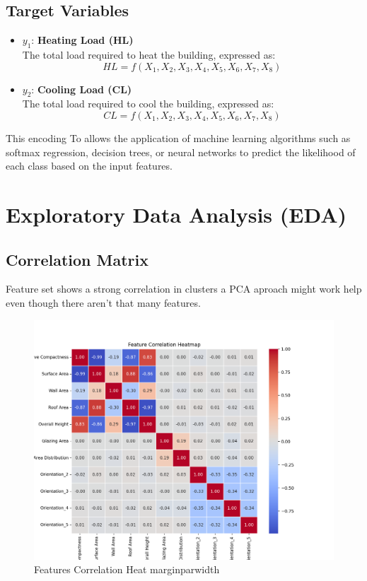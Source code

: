 \documentclass{article}
\begin{document}
\subsection{Target Variables}
\begin{itemize}
    \item \( y_1 \): \textbf{Heating Load (HL)}\\
    The total load required to heat the building, expressed as:
    \[
    HL = f(X_1, X_2, X_3, X_4, X_5, X_6, X_7, X_8)
    \]
    
    \item \( y_2 \): \textbf{Cooling Load (CL)}\\
    The total load required to cool the building, expressed as:
    \[
    CL = f(X_1, X_2, X_3, X_4, X_5, X_6, X_7, X_8)
    \]
\end{itemize}
This encoding To allows the application of machine learning algorithms such as softmax regression, decision trees, or neural networks to predict the likelihood of each class based on the input features.

\section{Exploratory Data Analysis (EDA)}

\subsection{Correlation Matrix}

Feature set shows a strong correlation in clusters
a PCA aproach might work help even though there aren't that many features.

\begin{figure}[H]  
    \centering
    \includegraphics[width=1\linewidth]{Feature_Correlation_Heatmap.png}
    \caption{Features Correlation Heat marginparwidth}
    \vspace{-1em} %
    \end{figure}
\end{document}
